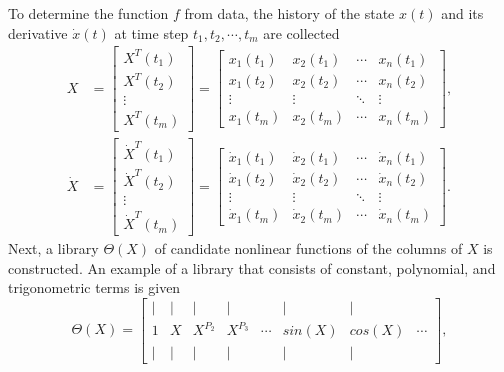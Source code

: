 To determine the function $f$ from data, the history of the state $x(t)$ and its derivative $\dot{x}(t)$ at time step $t_1, t_2, \cdots, t_m$ are collected \cite{bruntonDiscoveringGoverningEquations2016}
\begin{align*}
    X &=
    \begin{bmatrix}
        X^T(t_1) \\
        X^T(t_2) \\
        \vdots \\
        X^T(t_m)
    \end{bmatrix} =
    \begin{bmatrix}
        x_1(t_1) & x_2(t_1) & \cdots & x_n(t_1) \\
        x_1(t_2) & x_2(t_2) & \cdots & x_n(t_2) \\
        \vdots & \vdots & \ddots & \vdots \\
        x_1(t_m) & x_2(t_m) & \cdots & x_n(t_m)
    \end{bmatrix}, \\
    \dot{X} &=
    \begin{bmatrix}
        \dot{X}^T(t_1) \\
        \dot{X}^T(t_2) \\
        \vdots \\
        \dot{X}^T(t_m)
    \end{bmatrix} =
    \begin{bmatrix}
        \dot{x}_1(t_1) & \dot{x}_2(t_1) & \cdots & \dot{x}_n(t_1) \\
        \dot{x}_1(t_2) & \dot{x}_2(t_2) & \cdots & \dot{x}_n(t_2) \\
        \vdots & \vdots & \ddots & \vdots \\
        \dot{x}_1(t_m) & \dot{x}_2(t_m) & \cdots & \dot{x}_n(t_m)
    \end{bmatrix}.
\end{align*}
Next, a library $\Theta(X)$ of candidate nonlinear functions of the columns of $X$ is constructed.
An example of a library that consists of constant, polynomial, and trigonometric terms is given \cite{bruntonDiscoveringGoverningEquations2016}
\begin{equation*}
    \Theta(X) = \begin{bmatrix}
        | & | & |       & |       &        & |      & |      & \\
        1 & X & X^{P_2} & X^{P_3} & \cdots & sin(X) & cos(X) & \cdots \\
        | & | & |       & |       &        & |      & |      &
    \end{bmatrix},
\end{equation*}
